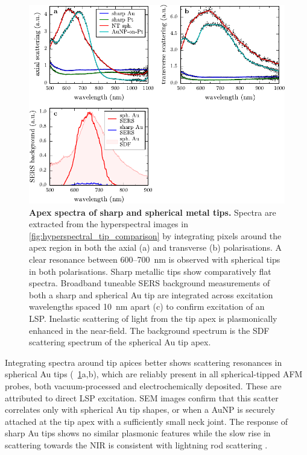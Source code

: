 \documentclass{article}
\begin{document}
\begin{figure}[bt]
\centering
\includegraphics{figures/apex_spectra_comparison}
\caption[Apex spectra of sharp and spherical metal tips]{\textbf{Apex spectra of sharp and spherical metal tips.} Spectra are extracted from the hyperspectral images in \autoref{fig:hyperspectral_tip_comparison} by integrating pixels around the apex region in both the axial (a) and transverse (b) polarisations. A clear resonance between 600--\SI{700}{nm} is observed with spherical tips in both polarisations. Sharp metallic tips show comparatively flat spectra.
Broadband tuneable SERS background measurements of both a sharp and spherical Au tip are integrated across excitation wavelengths spaced \SI{10}{nm} apart (c) to confirm excitation of an LSP. Inelastic scattering of light from the tip apex is plasmonically enhanced in the near-field. The background spectrum is the SDF scattering spectrum of the spherical Au tip apex.
}
\label{fig:apex_spectra}
\vspace{-5pt}
\end{figure}

Integrating spectra around tip apices better shows scattering resonances in spherical Au tips (\figurename~\ref{fig:apex_spectra}a,b), which are reliably present in all spherical-tipped AFM probes, both vacuum-processed and electrochemically deposited. These are attributed to direct LSP excitation. SEM images confirm that this scatter correlates only with spherical Au tip shapes, or when a AuNP is securely attached at the tip apex with a sufficiently small neck joint. The response of sharp Au tips shows no similar plasmonic features while the slow rise in scattering towards the NIR is consistent with lightning rod scattering \cite{zhang2009}.
\end{document}
